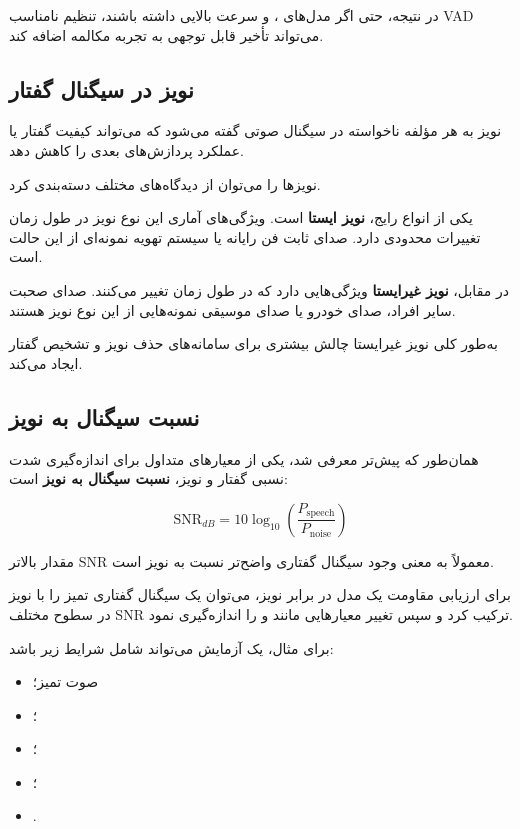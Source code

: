 در نتیجه، حتی اگر مدل‌های ،  و  سرعت بالایی داشته
باشند، تنظیم نامناسب VAD می‌تواند تأخیر قابل توجهی به تجربه
مکالمه اضافه کند.


\subsection{نویز در سیگنال گفتار}

نویز به هر مؤلفه ناخواسته در سیگنال صوتی گفته می‌شود که
می‌تواند کیفیت گفتار یا عملکرد پردازش‌های بعدی را کاهش دهد.

نویزها را می‌توان از دیدگاه‌های مختلف دسته‌بندی کرد.

یکی از انواع رایج،
\textbf{نویز ایستا}
است.
ویژگی‌های آماری این نوع نویز در طول زمان تغییرات محدودی دارد.
صدای ثابت فن رایانه یا سیستم تهویه نمونه‌ای از این حالت است.

در مقابل،
\textbf{نویز غیرایستا}
ویژگی‌هایی دارد که در طول زمان تغییر می‌کنند.
صدای صحبت سایر افراد، صدای خودرو یا صدای موسیقی نمونه‌هایی از
این نوع نویز هستند.

به‌طور کلی نویز غیرایستا چالش بیشتری برای سامانه‌های حذف نویز
و تشخیص گفتار ایجاد می‌کند.


\subsection{نسبت سیگنال به نویز}

همان‌طور که پیش‌تر معرفی شد، یکی از معیارهای متداول برای
اندازه‌گیری شدت نسبی گفتار و نویز،
\textbf{نسبت سیگنال به نویز}
است:

\begin{equation}
\mathrm{SNR}_{dB}
=
10
\log_{10}
\left(
\frac{P_{\mathrm{speech}}}
     {P_{\mathrm{noise}}}
\right)
\end{equation}

مقدار بالاتر SNR معمولاً به معنی وجود سیگنال گفتاری واضح‌تر
نسبت به نویز است.

برای ارزیابی مقاومت یک مدل  در برابر نویز، می‌توان یک
سیگنال گفتاری تمیز را با نویز در سطوح مختلف SNR ترکیب کرد
و سپس تغییر معیارهایی مانند  و  را اندازه‌گیری نمود.

برای مثال، یک آزمایش می‌تواند شامل شرایط زیر باشد:

\begin{itemize}

    \item صوت تمیز؛

    \item {}؛

    \item {}؛

    \item {}؛

    \item {}.

\end{itemize}

